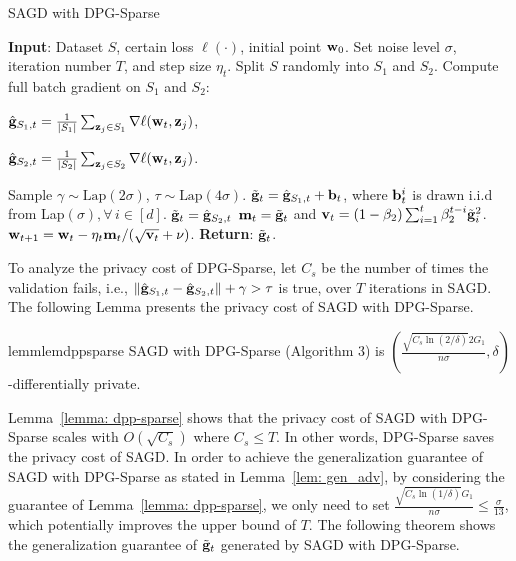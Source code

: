 \documentclass[11pt]{article}
\begin{document}

\begin{algorithm}[t]
\caption{SAGD with DPG-Sparse}
\begin{algorithmic}[1]
\label{algo: sparse}
\STATE \textbf{Input}: Dataset $S$,  certain loss $\ell(\cdot)$, initial point $\mathbf{w}_0$.
\STATE Set  noise level $\sigma$, iteration number $T$,  and step size $\eta_t$.
\STATE Split $S$ randomly into $S_1$ and $S_2$. 
\STATE   Compute full batch gradient on $S_1$ and $S_2$:\\
\centerline{$\hat {\mathbf{g}}_{S_1,t} = \frac{1}{|S_1|} \sum_{\mathbf{z}_j \in S_1}\nabla \ell(\mathbf{w}_t, \mathbf{z}_j)$,}
\centerline{$\hat {\mathbf{g}}_{S_2,t} = \frac{1}{|S_2|} \sum_{\mathbf{z}_j \in S_2}\nabla \ell(\mathbf{w}_t, \mathbf{z}_j)$.}
\STATE Sample $\gamma \sim \text{Lap}(2\sigma)$, $\tau \sim \text{Lap}(4\sigma)$.
\STATE  $\tilde {\mathbf{g}}_t = \hat {\mathbf{g}}_{S_1,t} + \mathbf{b}_t$, where $\mathbf{b}_t^i$ is drawn i.i.d from Lap$(\sigma), \forall\, i \in [d]$.
\ELSE \STATE $\tilde {\mathbf{g}}_t = \hat {\mathbf{g}}_{S_2,t}$
\ENDIF
\STATE 
$\mathbf{m}_t = \tilde {\mathbf{g}}_t$ and $\mathbf{v}_t = \left(1-\beta_{2}\right) \sum_{i=1}^{t} \beta_{2}^{t-i} \tilde {\mathbf{g}}_{i}^{2}$.
\STATE $\mathbf{w}_{t+1}=\mathbf{w}_{t}-\eta_t \mathbf{m}_t /(\sqrt{\mathbf{v}_t}+\nu)$.
\ENDFOR 
\STATE \textbf{Return}: $\tilde {\mathbf{g}}_t$.
\end{algorithmic}
\end{algorithm}


To analyze the privacy cost of DPG-Sparse, let $C_{s}$ be the number of times the validation fails, i.e., $\| \hat {\mathbf{g}}_{S_1,t} - \hat {\mathbf{g}}_{S_2,t}\| + \gamma >  \tau$ is true, over $T$ iterations in SAGD. The following Lemma presents the privacy cost of SAGD with DPG-Sparse.

\begin{restatable}{lemm}{lemdppsparse}
\label{lemma: dpp-sparse}
SAGD with DPG-Sparse  (Algorithm 3) is  
$(\frac{\sqrt{C_{s} \ln(2/\delta)} 2G_1}{n\sigma}, \delta)$-differentially private. 
\end{restatable}




Lemma~\ref{lemma: dpp-sparse} shows that the privacy cost of  SAGD with DPG-Sparse scales with $O(\sqrt{C_{s}})$ where $C_{s} \leq T$. In other words, DPG-Sparse saves the privacy cost of SAGD. In order to achieve the generalization guarantee of SAGD with DPG-Sparse as stated in Lemma~\ref{lem: gen_adv},  by considering the guarantee of Lemma~\ref{lemma: dpp-sparse},  we only need to set $\frac{\sqrt{C_{s} \ln(1/\delta)} G_1}{n\sigma} \leq \frac{\sigma}{13}$, which potentially improves the upper bound of $T$. 
The following theorem shows the generalization guarantee of $\tilde {\mathbf{g}}_t$ generated by SAGD with DPG-Sparse.
\end{document}
